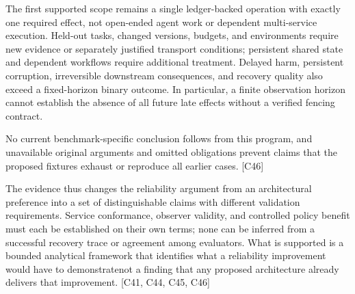\documentclass[11pt]{article}
\begin{document}
The first supported scope remains a single ledger-backed operation with exactly one required effect, not open-ended agent work or dependent multi-service execution. Held-out tasks, changed versions, budgets, and environments require new evidence or separately justified transport conditions; persistent shared state and dependent workflows require additional treatment. Delayed harm, persistent corruption, irreversible downstream consequences, and recovery quality also exceed a fixed-horizon binary outcome. In particular, a finite observation horizon cannot establish the absence of all future late effects without a verified fencing contract.

No current benchmark-specific conclusion follows from this program, and unavailable original arguments and omitted obligations prevent claims that the proposed fixtures exhaust or reproduce all earlier cases. [C46]

The evidence thus changes the reliability argument from an architectural preference into a set of distinguishable claims with different validation requirements. Service conformance, observer validity, and controlled policy benefit must each be established on their own terms; none can be inferred from a successful recovery trace or agreement among evaluators. What is supported is a bounded analytical framework that identifies what a reliability improvement would have to demonstrate\textemdash{}not a finding that any proposed architecture already delivers that improvement. [C41, C44, C45, C46]
\end{document}
